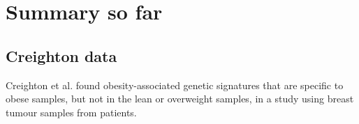 \documentclass[a4paper, 11pt]{article}
\begin{document}
\section*{Summary so far}

\subsection*{Creighton data}

Creighton et al. found obesity-associated genetic signatures that are specific to obese samples, but not in the lean or overweight samples, in a study using breast tumour samples from patients.
\end{document}
